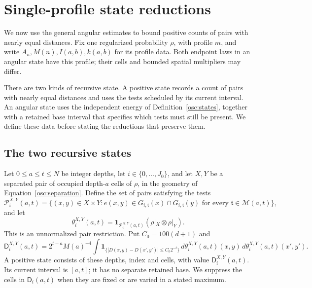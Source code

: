 \section{Single-profile state reductions}\label{rec:section}

We now use the general angular estimates to bound positive counts of
pairs with nearly equal distances.  Fix one regularized probability
$\rho$, with profile $m$, and write $A_n,M(n),I(a,b),k(a,b)$ for its
profile data.  Both endpoint laws in an angular state have this profile;
their cells and bounded spatial multipliers may differ.

There are two kinds of recursive state.  A positive state records a
count of pairs with nearly equal distances and uses the tests scheduled by its current
interval.  An angular state uses the independent energy of
Definition~\ref{osc:states}, together with a retained base interval that
specifies which tests must still be present.  We define these data before
stating the reductions that preserve them.

\subsection{The two recursive states}

\begin{definition}\label{osc:positive-count}
Let $0\le a\le t\le N$ be integer depths, let
$i\in\{0,\ldots,J_0\}$, and let $X,Y$ be a separated pair of occupied
depth-$a$ cells of $\rho$, in the geometry of
Equation~\eqref{osc:separation}.  Define the set of pairs satisfying the tests
\[
 \mathcal P_i^{X,Y}(a,t)=
 \bigl\{(x,y)\in X\times Y:
 e(x,y)\in G_{i,\mathfrak t}(x)\cap G_{i,\mathfrak t}(y)
 \text{ for every }\mathfrak t\in\mathcal M(a,t)\bigr\},
\]
and let
\[
 \theta_i^{X,Y}(a,t)
 =\mathbf1_{\mathcal P_i^{X,Y}(a,t)}
       (\rho|_X\otimes\rho|_Y).
\]
This is an unnormalized pair restriction.  Put $C_0=100(d+1)$ and
\begin{equation}\label{osc:count}
 \mathsf D_i^{X,Y}(a,t)
 =2^{t-a}M(a)^{-4}
   \int\mathbf1_{\{|D(x,y)-D(x',y')|\le C_0 2^{-t}\}}
   \,d\theta_i^{X,Y}(a,t)(x,y)
   \,d\theta_i^{X,Y}(a,t)(x',y').
\end{equation}
A positive state consists of these depths, index and cells, with value
$\mathsf D_i^{X,Y}(a,t)$.  Its current interval is $[a,t]$; it has no
separate retained base.  We suppress the cells in $\mathsf D_i(a,t)$ when
they are fixed or are varied in a stated maximum.
\end{definition}

